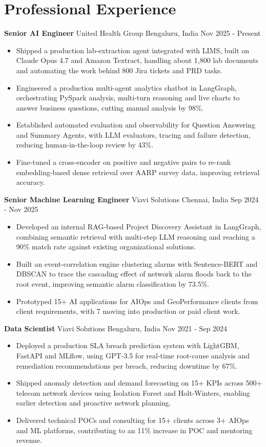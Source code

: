 \documentclass[10pt,a4paper]{article}
\newcommand{\role}[4]{\textbf{#1} \textbar{} #2 \hfill #3 \textbar{} #4\par}
\begin{document}
\section{Professional Experience}
\role{Senior AI Engineer}{United Health Group}{Bengaluru, India}{Nov 2025 - Present}
\begin{itemize}
  \item Shipped a production lab-extraction agent integrated with LIMS, built on Claude Opus 4.7 and Amazon Textract, handling about 1,800 lab documents and automating the work behind 800 Jira tickets and PRD tasks.
  \item Engineered a production multi-agent analytics chatbot in LangGraph, orchestrating PySpark analysis, multi-turn reasoning and live charts to answer business questions, cutting manual analysis by 98\%.
  \item Established automated evaluation and observability for Question Answering and Summary Agents, with LLM evaluators, tracing and failure detection, reducing human-in-the-loop review by 43\%.
  \item Fine-tuned a cross-encoder on positive and negative pairs to re-rank embedding-based dense retrieval over AARP survey data, improving retrieval accuracy.
\end{itemize}
\vspace{3pt}
\role{Senior Machine Learning Engineer}{Viavi Solutions}{Chennai, India}{Sep 2024 - Nov 2025}
\begin{itemize}
  \item Developed an internal RAG-based Project Discovery Assistant in LangGraph, combining semantic retrieval with multi-step LLM reasoning and reaching a 90\% match rate against existing organizational solutions.
  \item Built an event-correlation engine clustering alarms with Sentence-BERT and DBSCAN to trace the cascading effect of network alarm floods back to the root event, improving semantic alarm classification by 73.5\%.
  \item Prototyped 15+ AI applications for AIOps and GeoPerformance clients from client requirements, with 7 moving into production or paid client work.
\end{itemize}
\vspace{3pt}
\role{Data Scientist}{Viavi Solutions}{Bengaluru, India}{Nov 2021 - Sep 2024}
\begin{itemize}
  \item Deployed a production SLA breach prediction system with LightGBM, FastAPI and MLflow, using GPT-3.5 for real-time root-cause analysis and remediation recommendations per breach, reducing downtime by 67\%.
  \item Shipped anomaly detection and demand forecasting on 15+ KPIs across 500+ telecom network devices using Isolation Forest and Holt-Winters, enabling earlier detection and proactive network planning.
  \item Delivered technical POCs and consulting for 15+ clients across 3+ AIOps and ML platforms, contributing to an 11\% increase in POC and mentoring revenue.
\end{itemize}
\end{document}
